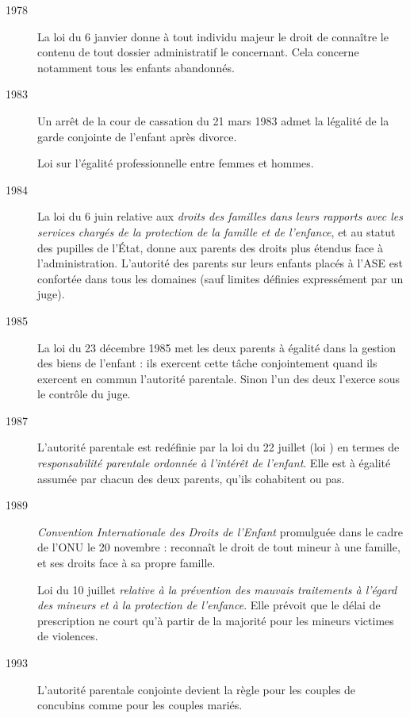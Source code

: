 \begin{description}
\item[1978] La loi du 6 janvier donne à tout individu majeur le droit de connaître le contenu de tout dossier administratif le concernant. Cela concerne notamment tous les enfants abandonnés.

\item[1983] Un arrêt de la cour de cassation du 21 mars 1983 admet la légalité de la garde conjointe de l'enfant après divorce.

Loi sur l'égalité professionnelle entre femmes et hommes.

\item[1984] La loi du 6 juin relative aux \emph{droits des familles dans leurs rapports avec les services chargés de la protection de la famille et de l'enfance}, et au statut des pupilles de l'État, donne aux parents des droits plus étendus face à l'administration. L'autorité des parents sur leurs enfants placés à l'ASE est confortée dans tous les domaines (sauf limites définies expressément par un juge).

\item[1985] La loi du 23 décembre 1985 met les deux parents à égalité dans la gestion des biens de l'enfant : ils exercent cette tâche conjointement quand ils exercent en commun l'autorité parentale. Sinon l'un des deux l'exerce sous le contrôle du juge.

\item[1987] L'autorité parentale est redéfinie par la loi du 22 juillet (loi ) en termes de \emph{responsabilité parentale ordonnée à l'intérêt de l'enfant}. Elle est à égalité assumée par chacun des deux parents, qu'ils cohabitent ou pas.

\item[1989] \emph{Convention Internationale des Droits de l'Enfant} promulguée dans le cadre de l'ONU le 20 novembre : reconnaît le droit de tout mineur à une famille, et ses droits face à sa propre famille.

Loi du 10 juillet \emph{relative à la prévention des mauvais traitements à l'égard des mineurs et à la protection de l'enfance}. Elle prévoit que le délai de prescription ne court qu'à partir de la majorité pour les mineurs victimes de violences.

\item[1993] L'autorité parentale conjointe devient la règle pour les couples de concubins comme pour les couples mariés.


\end{description}
